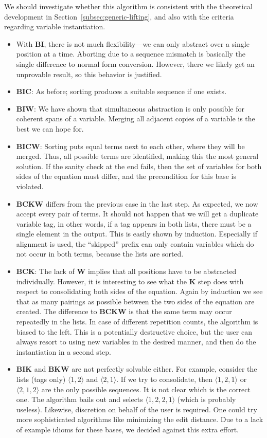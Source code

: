 We should investigate whether this algorithm is consistent with the theoretical
development in Section~\ref{subsec:generic-lifting}, and also with the
criteria regarding variable instantiation.
\begin{itemize}
\item With $\mathbf{BI}$, there is not much flexibility---we can only abstract
	over a single position at a time.
	Aborting due to a sequence mismatch is basically the single difference to
	normal form conversion.
	However, there we likely get an unprovable result, so this
	behavior is justified.
\item $\mathbf{BIC}$: As before; sorting produces a suitable sequence if one
	exists.
\item $\mathbf{BIW}$: We have shown that simultaneous abstraction is only
	possible for coherent spans of a variable.
	Merging all adjacent copies of a variable is the best we can hope for.
\item $\mathbf{BICW}$: Sorting puts equal terms next to each other, where they
	will be merged.
	Thus, all possible terms are identified, making this the most general
	solution.
	If the sanity check at the end fails, then the set of variables for both
	sides of the equation must differ, and the precondition for this base is
	violated.
\item $\mathbf{BCKW}$ differs from the previous case in the last step.
	As expected, we now accept every pair of terms.
	It should not happen that we will get a duplicate variable tag, in other words,
	if a tag appears in both lists, there must be a single element in the output.
	This is easily shown by induction.
	Especially if alignment is used, the ``skipped'' prefix can only contain
	variables which do not occur in both terms, because the lists are sorted.
\item $\mathbf{BCK}$: The lack of $\mathbf{W}$ implies that all positions
	have to be abstracted individually.
	However, it is interesting to see what the $\mathbf{K}$ step does with
	respect to consolidating both sides of the equation.
	Again by induction we see that as many pairings as possible between the
	two sides of the equation are created.
	The difference to $\mathbf{BCKW}$ is that the same term may occur repeatedly
	in the lists.
	In case of different repetition counts, the algorithm is biased to the left.
	This is a potentially destructive choice, but the user can always resort
	to using new variables in the desired manner, and then do the instantiation
	in a second step.
\item $\mathbf{BIK}$ and $\mathbf{BKW}$ are not perfectly solvable either.
	For example, consider the lists (tags only) $\langle 1,2\rangle$ and $\langle 2,1\rangle$.
	If we try to consolidate, then $\langle 1,2,1\rangle$ or $\langle 2,1,2\rangle$
	are the only possible sequences.
	It is not clear which is the correct one.
	The algorithm bails out and selects $\langle 1,2,2,1\rangle$ (which is
	probably useless).
	Likewise, discretion on behalf of the user is required.
	One could try more sophisticated algorithms like minimizing the edit
	distance.
	Due to a lack of example idioms for these bases, we decided against this
	extra effort.
\end{itemize}
